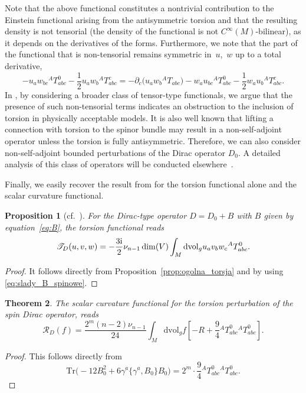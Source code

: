 \documentclass[10pt,a4paper]{amsart}
\numberwithin{equation}{section}
\newtheorem{Theorem}{Theorem}[section]
\newtheorem{Proposition}[Theorem]{Proposition}
\theoremstyle{definition}
\def\Tr{\mathrm{Tr}}
\def\dv{\mathrm{dvol}_g}
\begin{document}
Note that the above functional constitutes a nontrivial contribution to the Einstein functional arising from the antisymmetric torsion and that the resulting density is not tensorial (the density of the functional is not $C^\infty(M)$-bilinear), as it depends on the derivatives of the forms. Furthermore, we note that the part of the functional that is non-tensorial remains symmetric in~$u$,~$w$ up to a total derivative,
\[
 - u_a w_{bc}{}^AT^{0}_{abc} - \frac{1}{2} u_a w_{b} {}^AT^{c}_{abc}
= - \partial_c \bigl( u_a w_{b}{}^AT_{abc} \bigr)
 - w_a u_{bc}{}^AT^{0}_{abc} - \frac{1}{2} w_a u_{b} {}^AT^{c}_{abc}.
\]
In \cite{bochniak2025}, by considering a broader class of tensor-type functionals, we argue that the presence of such non-tensorial terms indicates an obstruction to the inclusion of torsion in physically acceptable models. It is also well known that lifting a connection with torsion to the spinor bundle may result in a non-self-adjoint operator unless the torsion is fully antisymmetric. Therefore, we can also consider non-self-adjoint bounded perturbations of the Dirac operator $D_0$. A detailed analysis of this class of operators will be conducted elsewhere~\cite{to_appear}.

Finally, we easily recover the result from \cite{dabrowski2024} for the torsion functional alone and the scalar curvature functional.
\begin{Proposition}[{cf.\ \cite[Theorem~2.2]{dabrowski2024}}]
	For the Dirac-type operator $D=D_0+B$ with $B$ given by equation~\eqref{eq:B}, the torsion functional reads
	\[
		\mathscr{T}_D(u,v,w)= -\frac{3{\rm i}}{2}\nu_{n-1}\dim(V)\int_M \dv u_{a}v_bw_c {}^AT^{0}_{abc}.
	\]
\end{Proposition}
\begin{proof}
It follows directly from Proposition~\ref{prop:ogolna_torsja} and by using \eqref{eq:slady_B_spinowe}.
\end{proof}

\begin{Theorem}\label{EH-spinD}
The scalar curvature functional for the torsion perturbation of the spin Dirac operator,
 reads
\[
	\mathscr{R}_D(f)=\frac{2^m(n-2)\nu_{n-1}}{24}\int_M \dv f \left[-R+\frac{9}{4}{}^AT_{abc}^0{}^AT_{abc}^0\right].
\]
\end{Theorem}
\begin{proof}
This follows directly from
\[
	\Tr\bigl(-12 B_0^2 +6\gamma^a\{\gamma^a, B_0\}B_0\bigr)=2^m \cdot \frac{9}{4} {}^AT_{abc}^0 {}^AT_{abc}^0.\tag*{\qed}
\]\renewcommand{\qed}{}
\end{proof}
\end{document}

